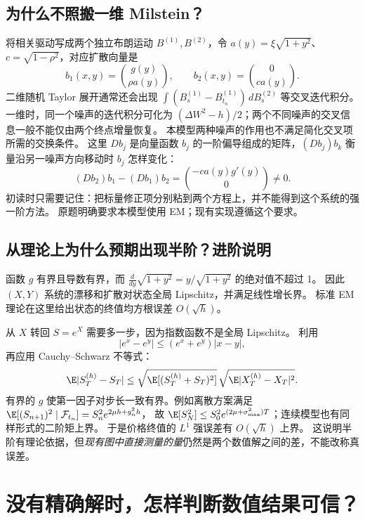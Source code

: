 \subsection{为什么不照搬一维 Milstein？}
将相关驱动写成两个独立布朗运动 $B^{(1)},B^{(2)}$，令 $a(y)=\xi\sqrt{1+y^2}$、$c=\sqrt{1-\rho^2}$，对应扩散向量是
\begin{equation}\label{eq:na-diffusion-columns}
 b_1(x,y)=\binom{g(y)}{\rho a(y)},\qquad b_2(x,y)=\binom{0}{ca(y)}.
\end{equation}
二维随机 Taylor 展开通常还会出现 $\int(B^{(1)}_s-B^{(1)}_{t_n})\,dB_s^{(2)}$ 等交叉迭代积分。
一维时，同一个噪声的迭代积分可化为 $(\Delta W^2-h)/2$；两个不同噪声的交叉信息一般不能仅由两个终点增量恢复。
本模型两种噪声的作用也不满足简化交叉项所需的交换条件。
这里 $Db_j$ 是向量函数 $b_j$ 的一阶偏导组成的矩阵，$(Db_j)b_k$ 衡量沿另一噪声方向移动时 $b_j$ 怎样变化：
\begin{equation}\label{eq:na-noncommute}
 (Db_2)b_1-(Db_1)b_2=\binom{-ca(y)g'(y)}0\ne0.
\end{equation}
初读时只需要记住：把标量修正项分别粘到两个方程上，并不能得到这个系统的强一阶方法。
原题明确要求本模型使用 EM；现有实现遵循这个要求。

\subsection{从理论上为什么预期出现半阶？进阶说明}
函数 $g$ 有界且导数有界，而
$\frac{d}{dy}\sqrt{1+y^2}=y/\sqrt{1+y^2}$ 的绝对值不超过 1。
因此 $(X,Y)$ 系统的漂移和扩散对状态全局 Lipschitz，并满足线性增长界。
标准 EM 理论在这里给出状态的终值均方根误差 $O(\sqrt h)$。

从 $X$ 转回 $S=e^X$ 需要多一步，因为指数函数不是全局 Lipschitz。
利用
\begin{equation}\label{eq:na-exp-error}
 |e^x-e^y|\le(e^x+e^y)|x-y|,
\end{equation}
再应用 Cauchy--Schwarz 不等式：
\begin{equation}\label{eq:na-strong-bound}
 \E|S_T^{(h)}-S_T|
 \le \sqrt{\E[(S_T^{(h)}+S_T)^2]}\,
       \sqrt{\E|X_T^{(h)}-X_T|^2}.
\end{equation}
有界的 $g$ 使第一因子对步长一致有界。例如离散方案满足
$\E[(S_{n+1})^2\mid\mathcal F_{t_n}]=S_n^2e^{2\mu h+g_n^2h}$，
故 $\E[S_N^2]\le S_0^2e^{(2\mu+\sigma_{\max}^2)T}$；连续模型也有同样形式的二阶矩上界。
于是价格终值的 $L^1$ 强误差有 $O(\sqrt h)$ 上界。
这说明半阶有理论依据，但\emph{现有图中直接测量的量}仍然是两个数值解之间的差，不能改称真误差。

\section{没有精确解时，怎样判断数值结果可信？}\label{sec:reference}
